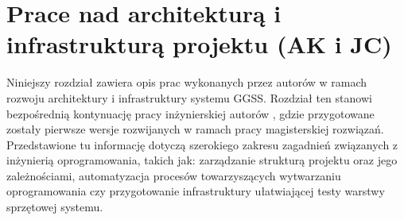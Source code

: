 \chapter{Prace nad architekturą i infrastrukturą projektu (AK i JC)}
\label{cha:infra}

\graphicspath{{4_infrastructure/static/}}

Niniejszy rozdział zawiera opis prac wykonanych przez autorów w ramach rozwoju architektury i infrastruktury systemu GGSS. Rozdział ten stanowi bezpośrednią kontynuację pracy inżynierskiej autorów \cite{GGSS_inz}, gdzie przygotowane zostały pierwsze wersje rozwijanych w ramach pracy magisterskiej rozwiązań. Przedstawione tu informację dotyczą szerokiego zakresu zagadnień związanych z inżynierią oprogramowania, takich jak: zarządzanie strukturą projektu oraz jego zależnościami, automatyzacja procesów towarzyszących wytwarzaniu oprogramowania czy przygotowanie infrastruktury ułatwiającej testy warstwy sprzętowej systemu. 







